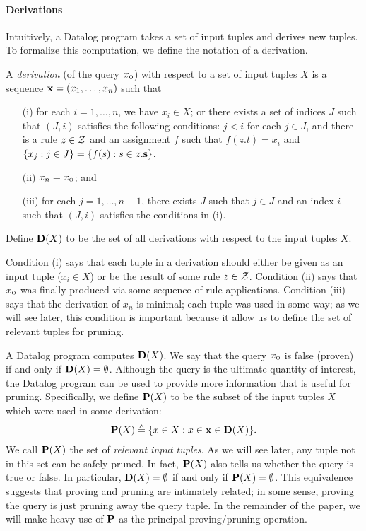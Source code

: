 \paragraph{Derivations}

Intuitively, a Datalog program takes a set of input tuples and derives new
tuples.  To formalize this computation, we define the notation of a derivation.

A {\em derivation} (of the query $x_\text{\sc o}$) with respect to a set of input tuples
$X$ is a sequence $\mathbf{x} = (x_1, \dots, x_n)$ such that
\begin{enumerate}
\item [(i)] for each $i = 1, \dots, n$, we have $x_i \in X$; or
there exists a set of indices $J$ such that $(J,i)$ satisfies the following conditions:
$j < i$ for each $j \in J$, and
there is a rule $z \in \mathcal{Z}$ and an assignment $f$
such that $f(z.t) = x_i$ and
$\{ x_j : j \in J \} = \{ f(s) : s \in z.\mathbf{s} \}$.
\item [(ii)] $x_n = x_\text{\sc o}$; and
\item [(iii)] 
for each $j = 1, \dots, n\!-\!1$,
there exists $J$ such that $j \in J$ and an index $i$
such that $(J,i)$ satisfies the conditions in (i).
\end{enumerate}
Define $\mathbf{D}(X)$ to be the set of all derivations with respect to the input tuples $X$.

Condition (i) says that each tuple in a derivation
should either be given as an input tuple ($x_i \in X$)
or be the result of some rule $z \in \mathcal{Z}$.
Condition (ii) says that $x_\text{\sc o}$ was finally produced via some sequence of rule applications.
Condition (iii) says that the derivation of $x_n$ is minimal; each tuple was
used in some way; as we will see later, this condition is important because it allow us to
define the set of relevant tuples for pruning.

A Datalog program computes $\mathbf{D}(X)$.
We say that the query $x_\text{\sc o}$ is false (proven) if and only if $\mathbf{D}(X) = \emptyset$.
Although the query is the ultimate quantity of interest,
the Datalog program can be used to provide more information that is useful for pruning.
Specifically, we define $\mathbf{P}(X)$ to be the subset of the input tuples $X$
which were used in some derivation:
\begin{align}
\label{eqn:Pdef}
\mathbf{P}(X) \triangleq \{ x \in X : x \in \mathbf{x} \in \mathbf{D}(X) \}.
\end{align}
We call $\mathbf{P}(X)$ the set of {\em relevant input tuples}.  As we will see later,
any tuple not in this set can be safely pruned.
In fact, $\mathbf{P}(X)$ also tells us whether the query is true or false.
In particular, $\mathbf{D}(X) = \emptyset$ if and only if $\mathbf{P}(X) = \emptyset$.
This equivalence suggests that proving and pruning are intimately related;
in some sense, proving the query is just pruning away the query tuple.
In the remainder of the paper, we will make heavy use of $\mathbf{P}$ as the principal
proving/pruning operation.

